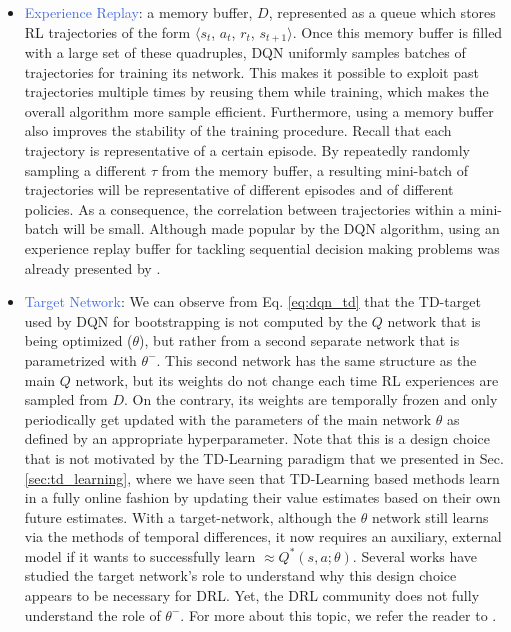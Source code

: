 \begin{itemize}
	\item \textcolor{RoyalBlue}{Experience Replay}: a memory buffer, $D$, represented as a queue which stores RL trajectories of the form $\langle s_{t}$, $a_{t}$, $r_{t}$, $s_{t+1} \rangle$. Once this memory buffer is filled with a large set of these quadruples, DQN uniformly samples batches of trajectories for training its network. This makes it possible to exploit past trajectories multiple times by reusing them while training, which makes the overall algorithm more sample efficient. Furthermore, using a memory buffer also improves the stability of the training procedure. Recall that each trajectory is representative of a certain episode. By repeatedly randomly sampling a different $\tau$ from the memory buffer, a resulting mini-batch of trajectories will be representative of different episodes and of different policies. As a consequence, the correlation between trajectories within a mini-batch will be small. Although made popular by the DQN algorithm, using an experience replay buffer for tackling sequential decision making problems was already presented by \citet{lin1992self}.
		
	\item \textcolor{RoyalBlue}{Target Network}: We can observe from Eq. \ref{eq:dqn_td} that the TD-target used by DQN for bootstrapping is not computed by the $Q$ network that is being optimized ($\theta$), but rather from a second separate network that is parametrized with $\theta^{-}$. This second network has the same structure as the main $Q$ network, but its weights do not change each time RL experiences are sampled from $D$. On the contrary, its weights are temporally frozen and only periodically get updated with the parameters of the main network $\theta$ as defined by an appropriate hyperparameter. Note that this is a design choice that is not motivated by the TD-Learning paradigm that we presented in Sec. \ref{sec:td_learning}, where we have seen that TD-Learning based methods learn in a fully online fashion by updating their value estimates based on their own future estimates. With a target-network, although the $\theta$ network still learns via the methods of temporal differences, it now requires an auxiliary, external model if it wants to successfully learn $\approx Q^{*}(s,a;\theta)$. Several works have studied the target network's role to understand why this design choice appears to be necessary for DRL. Yet, the DRL community does not fully understand the role of $\theta^{-}$. For more about this topic, we refer the reader to \cite{kim2019deepmellow, piche2021beyond}.

\end{itemize}

